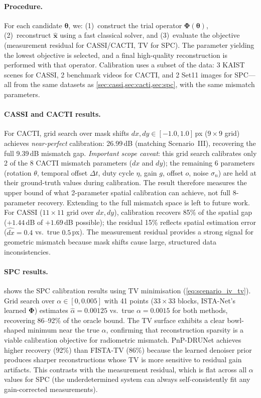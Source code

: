 \documentclass[runningheads]{llncs}
\begin{document}
\paragraph{Procedure.}
For each candidate $\boldsymbol{\theta}$, we: (1)~construct the trial operator $\mathbf{\Phi}(\boldsymbol{\theta})$, (2)~reconstruct $\hat{\mathbf{x}}$ using a fast classical solver, and (3)~evaluate the objective (measurement residual for CASSI/CACTI, TV for SPC).
The parameter yielding the lowest objective is selected, and a final high-quality reconstruction is performed with that operator.
Calibration uses a subset of the data: 3 KAIST scenes for CASSI, 2 benchmark videos for CACTI, and 2 Set11 images for SPC---all from the same datasets as \cref{sec:cassi,sec:cacti,sec:spc}, with the same mismatch parameters.

\paragraph{CASSI and CACTI results.}
For CACTI, grid search over mask shifts $dx, dy \in [-1.0, 1.0]$\,px ($9 \times 9$ grid) achieves \emph{near-perfect} calibration: 26.99\,dB (matching Scenario~III), recovering the full 9.39\,dB mismatch gap.
\emph{Important scope caveat}: this grid search calibrates only 2 of the 8 CACTI mismatch parameters ($dx$ and $dy$); the remaining 6 parameters (rotation $\theta$, temporal offset $\Delta t$, duty cycle $\eta$, gain $g$, offset $o$, noise $\sigma_n$) are held at their ground-truth values during calibration. The result therefore measures the upper bound of what 2-parameter spatial calibration can achieve, not full 8-parameter recovery. Extending to the full mismatch space is left to future work.
For CASSI ($11 \times 11$ grid over $dx, dy$), calibration recovers 85\% of the spatial gap ($+1.44$\,dB of $+1.69$\,dB possible); the residual 15\% reflects spatial estimation error ($\hat{dx}{=}0.4$ vs.\ true $0.5$\,px).
The measurement residual provides a strong signal for geometric mismatch because mask shifts cause large, structured data inconsistencies.

\paragraph{SPC results.}
 shows the SPC calibration results using TV minimisation (\cref{eq:scenario_iv_tv}).
Grid search over $\alpha \in [0, 0.005]$ with 41 points ($33 \times 33$ blocks, ISTA-Net's learned $\mathbf{\Phi}$) estimates $\hat{\alpha} = 0.00125$ vs.\ true $\alpha = 0.0015$ for both methods, recovering 86--92\% of the oracle bound.
The TV surface exhibits a clear bowl-shaped minimum near the true $\alpha$, confirming that reconstruction sparsity is a viable calibration objective for radiometric mismatch.
PnP-DRUNet achieves higher recovery (92\%) than FISTA-TV (86\%) because the learned denoiser prior produces sharper reconstructions whose TV is more sensitive to residual gain artifacts.
This contrasts with the measurement residual, which is flat across all $\alpha$ values for SPC (the underdetermined system can always self-consistently fit any gain-corrected measurements).
\end{document}
